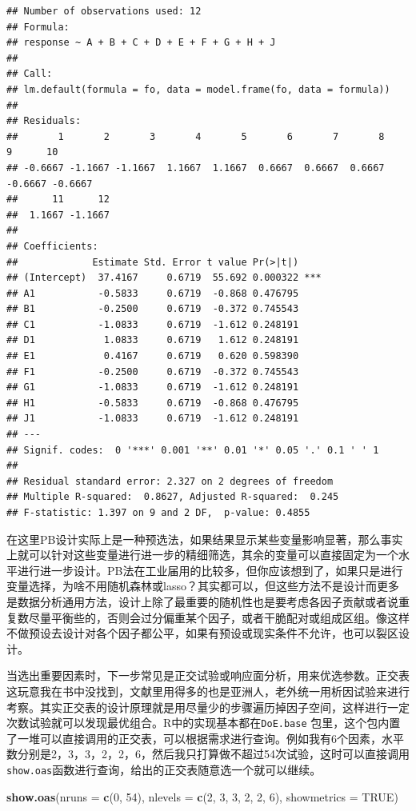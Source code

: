 \documentclass[]{tufte-book}
\newenvironment{Shaded}{}{}
\newcommand{\DataTypeTok}[1]{\textcolor[rgb]{0.56,0.13,0.00}{#1}}
\newcommand{\DecValTok}[1]{\textcolor[rgb]{0.25,0.63,0.44}{#1}}
\newcommand{\KeywordTok}[1]{\textcolor[rgb]{0.00,0.44,0.13}{\textbf{#1}}}
\newcommand{\NormalTok}[1]{#1}
\newcommand{\OtherTok}[1]{\textcolor[rgb]{0.00,0.44,0.13}{#1}}
\begin{document}
\begin{verbatim}
## Number of observations used: 12 
## Formula:
## response ~ A + B + C + D + E + F + G + H + J
## 
## Call:
## lm.default(formula = fo, data = model.frame(fo, data = formula))
## 
## Residuals:
##       1       2       3       4       5       6       7       8       9      10 
## -0.6667 -1.1667 -1.1667  1.1667  1.1667  0.6667  0.6667  0.6667 -0.6667 -0.6667 
##      11      12 
##  1.1667 -1.1667 
## 
## Coefficients:
##             Estimate Std. Error t value Pr(>|t|)    
## (Intercept)  37.4167     0.6719  55.692 0.000322 ***
## A1           -0.5833     0.6719  -0.868 0.476795    
## B1           -0.2500     0.6719  -0.372 0.745543    
## C1           -1.0833     0.6719  -1.612 0.248191    
## D1            1.0833     0.6719   1.612 0.248191    
## E1            0.4167     0.6719   0.620 0.598390    
## F1           -0.2500     0.6719  -0.372 0.745543    
## G1           -1.0833     0.6719  -1.612 0.248191    
## H1           -0.5833     0.6719  -0.868 0.476795    
## J1           -1.0833     0.6719  -1.612 0.248191    
## ---
## Signif. codes:  0 '***' 0.001 '**' 0.01 '*' 0.05 '.' 0.1 ' ' 1
## 
## Residual standard error: 2.327 on 2 degrees of freedom
## Multiple R-squared:  0.8627, Adjusted R-squared:  0.245 
## F-statistic: 1.397 on 9 and 2 DF,  p-value: 0.4855
\end{verbatim}

在这里PB设计实际上是一种预选法，如果结果显示某些变量影响显著，那么事实上就可以针对这些变量进行进一步的精细筛选，其余的变量可以直接固定为一个水平进行进一步设计。PB法在工业届用的比较多，但你应该想到了，如果只是进行变量选择，为啥不用随机森林或lasso？其实都可以，但这些方法不是设计而更多是数据分析通用方法，设计上除了最重要的随机性也是要考虑各因子贡献或者说重复数尽量平衡些的，否则会过分偏重某个因子，或者干脆配对或组成区组。像这样不做预设去设计对各个因子都公平，如果有预设或现实条件不允许，也可以裂区设计。

当选出重要因素时，下一步常见是正交试验或响应面分析，用来优选参数。正交表这玩意我在书中没找到，文献里用得多的也是亚洲人，老外统一用析因试验来进行考察。其实正交表的设计原理就是用尽量少的步骤遍历掉因子空间，这样进行一定次数试验就可以发现最优组合。R中的实现基本都在\texttt{DoE.base} 包里，这个包内置了一堆可以直接调用的正交表，可以根据需求进行查询。例如我有6个因素，水平数分别是2，3，3，2，2，6，然后我只打算做不超过54次试验，这时可以直接调用\texttt{show.oas}函数进行查询，给出的正交表随意选一个就可以继续。

\begin{Shaded}
\begin{Highlighting}[]
\KeywordTok{show.oas}\NormalTok{(}\DataTypeTok{nruns =} \KeywordTok{c}\NormalTok{(}\DecValTok{0}\NormalTok{, }\DecValTok{54}\NormalTok{), }\DataTypeTok{nlevels =} \KeywordTok{c}\NormalTok{(}\DecValTok{2}\NormalTok{, }\DecValTok{3}\NormalTok{, }\DecValTok{3}\NormalTok{, }\DecValTok{2}\NormalTok{, }\DecValTok{2}\NormalTok{, }\DecValTok{6}\NormalTok{), }\DataTypeTok{showmetrics =} \OtherTok{TRUE}\NormalTok{)}
\end{Highlighting}
\end{Shaded}
\end{document}
